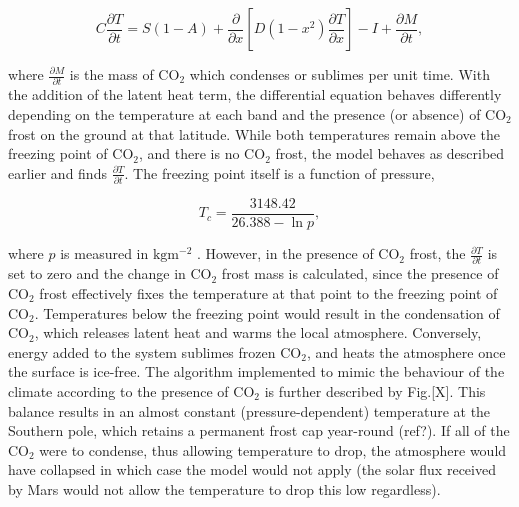 \documentclass[12pt,onecolumn]{revtex4-2}    %
\begin{document}
\begin{equation}
C \frac{\partial T}{\partial t} = S(1-A) + \frac{\partial}{\partial x} [D(1-x^{2})\frac{\partial T}{\partial x}] - I + \frac{\partial M}{\partial t},
\end{equation}

where $\frac{\partial M}{\partial t}$ is the mass of $\mathrm{CO_2}$ which condenses or sublimes per unit time. With the addition of the latent heat term, the differential equation behaves differently depending on the temperature at each band and the presence (or absence) of $\mathrm{CO_2}$ frost on the ground at that latitude. While both temperatures remain above the freezing point of $\mathrm{CO_2}$, and there is no $\mathrm{CO_2}$ frost, the model behaves as described earlier and finds $\frac{\partial T}{\partial t}$. The freezing point itself is a function of pressure, 

\begin{equation}
T_{c} = \frac{3148.42}{26.388 - \ln{p}},
\end{equation}

where $p$ is measured in $\mathrm{kg m^{-2}}$ \cite{H54}. However, in the presence of $\mathrm{CO_2}$ frost, the $\frac{\partial T}{\partial t}$ is set to zero and the change in $\mathrm{CO_2}$ frost mass is calculated, since the presence of  $\mathrm{CO_2}$ frost effectively fixes the temperature at that point to the freezing point of $\mathrm{CO_2}$. Temperatures below the freezing point would result in the condensation of $\mathrm{CO_2}$, which releases latent heat and warms the local atmosphere. Conversely, energy added to the system sublimes frozen $\mathrm{CO_2}$, and heats the atmosphere once the surface is ice-free. The algorithm implemented to mimic the behaviour of the climate according to the presence of $\mathrm{CO_2}$ is further described by Fig.[X]. This balance results in an almost constant (pressure-dependent) temperature at the Southern pole, which retains a permanent frost cap year-round (ref?).  If all of the $\mathrm{CO_2}$ were to condense, thus allowing temperature to drop, the atmosphere would have collapsed in which case the model would not apply (the solar flux received by Mars would not allow the temperature to drop this low regardless).
\end{document}
